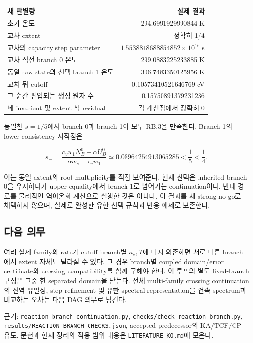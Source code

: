 \begin{longtable}[]{@{}lr@{}}
\toprule\noalign{}
새 판별량 & 실제 결과 \\
\midrule\noalign{}
\endhead
\bottomrule\noalign{}
\endlastfoot
초기 온도 & 294.6991929990844 K \\
교차 extent & 정확히 1/4 \\
교차의 capacity step parameter & \(1.5538818688854852\times10^{16}\) s \\
교차 직전 branch 0 온도 & 299.0883225233885 K \\
동일 raw state의 선택 branch 1 온도 & 306.7483350125956 K \\
교차 뒤 cutoff & 0.10573410521646769 eV \\
그 순간 편입되는 생성 원자 수 & 0.15750891379231236 \\
네 invariant 및 extent 식 residual & 각 계산점에서 정확히 0 \\
\end{longtable}

동일한 \(s=1/5\)에서 branch 0과 branch 1이 모두 RB.3을 만족한다. Branch 1의 lower consistency 시작점은

\[s_- =\frac{c_vw_1N_B^0-\alpha U_B^0}{\alpha w_s-c_vw_1}
\simeq0.08964254913065285 <\frac15<\frac14.\tag{RB.18}\]

이는 동일 extent의 root multiplicity를 직접 보여준다. 현재 선택은 inherited branch 0을 유지하다가 upper equality에서 branch 1로 넘어가는 continuation이다. 반대 경로를 물리적인 역이온화 계산으로 실행한 것은 아니다. 이 결과를 새 strong no-go로 채택하지 않으며, 실제로 완성한 유한 선택 규칙과 반응 예제로 보존한다.

\hypertarget{uxb2e4uxc74c-uxc758uxbb34}{%
\subsection{다음 의무}\label{uxb2e4uxc74c-uxc758uxbb34}}

여러 실제 family의 rate가 cutoff branch별 \(n_e,T\)에 다시 의존하면 서로 다른 branch에서 extent 자체도 달라질 수 있다. 그 경우 branch별 coupled domain/error certificate와 crossing compatibility를 함께 구해야 한다. 이 루프의 별도 fixed-branch 구성은 그중 한 separated domain을 닫는다. 전체 multi-family crossing continuation의 전역 유일성, step refinement 및 유한 spectral representation을 연속 spectrum과 비교하는 오차는 다음 DAG 의무로 남긴다.

근거: \nolinkurl{reaction_branch_continuation.py}, \nolinkurl{checks/check_reaction_branch.py}, \nolinkurl{results/REACTION_BRANCH_CHECKS.json}, accepted predecessor의 KA/TCF/CP 유도. 문헌과 현재 정리의 적용 범위 대응은 \texttt{LITERATURE\_KO.md}에 모은다.

